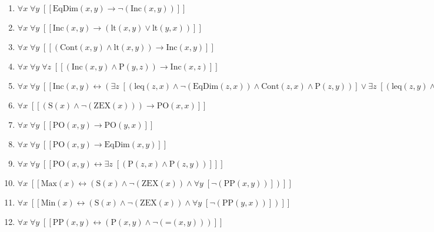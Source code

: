 \documentclass{article}
\begin{document}
\begin{enumerate}
\item $\forall x\; \forall y\;  \left[ \left[ \textrm{EqDim}(x,y) \rightarrow \neg \left(\textrm{Inc}(x,y)\right) \right] \right]$
\item $\forall x\; \forall y\;  \left[ \left[ \textrm{Inc}(x,y) \rightarrow \left(\textrm{lt}(x,y) \lor \textrm{lt}(y,x)\right) \right] \right]$
\item $\forall x\; \forall y\;  \left[ \left[ \left(\textrm{Cont}(x,y) \land \textrm{lt}(x,y)\right) \rightarrow \textrm{Inc}(x,y) \right] \right]$
\item $\forall x\; \forall y\; \forall z\;  \left[ \left[ \left(\textrm{Inc}(x,y) \land \textrm{P}(y,z)\right) \rightarrow \textrm{Inc}(x,z) \right] \right]$
\item $\forall x\; \forall y\;  \left[ \left[ \textrm{Inc}(x,y) \leftrightarrow \left(\exists z\;  \left[ \left(\textrm{leq}(z,x) \land \neg \left(\textrm{EqDim}(z,x)\right) \land \textrm{Cont}(z,x) \land \textrm{P}(z,y)\right) \right] \lor \exists z\;  \left[ \left(\textrm{leq}(z,y) \land \neg \left(\textrm{EqDim}(z,y)\right) \land \textrm{Cont}(z,y) \land \textrm{P}(z,x)\right) \right]\right) \right] \right]$
\item $\forall x\;  \left[ \left[ \left(\textrm{S}(x) \land \neg \left(\textrm{ZEX}(x)\right)\right) \rightarrow \textrm{PO}(x,x) \right] \right]$
\item $\forall x\; \forall y\;  \left[ \left[ \textrm{PO}(x,y) \rightarrow \textrm{PO}(y,x) \right] \right]$
\item $\forall x\; \forall y\;  \left[ \left[ \textrm{PO}(x,y) \rightarrow \textrm{EqDim}(x,y) \right] \right]$
\item $\forall x\; \forall y\;  \left[ \left[ \textrm{PO}(x,y) \leftrightarrow \exists z\;  \left[ \left(\textrm{P}(z,x) \land \textrm{P}(z,y)\right) \right] \right] \right]$
\item $\forall x\;  \left[ \left[ \textrm{Max}(x) \leftrightarrow \left(\textrm{S}(x) \land \neg \left(\textrm{ZEX}(x)\right) \land \forall y\;  \left[ \neg \left(\textrm{PP}(x,y)\right) \right]\right) \right] \right]$
\item $\forall x\;  \left[ \left[ \textrm{Min}(x) \leftrightarrow \left(\textrm{S}(x) \land \neg \left(\textrm{ZEX}(x)\right) \land \forall y\;  \left[ \neg \left(\textrm{PP}(y,x)\right) \right]\right) \right] \right]$
\item $\forall x\; \forall y\;  \left[ \left[ \textrm{PP}(x,y) \leftrightarrow \left(\textrm{P}(x,y) \land \neg \left(\textrm{=}(x,y)\right)\right) \right] \right]$

\end{enumerate}
\end{document}
